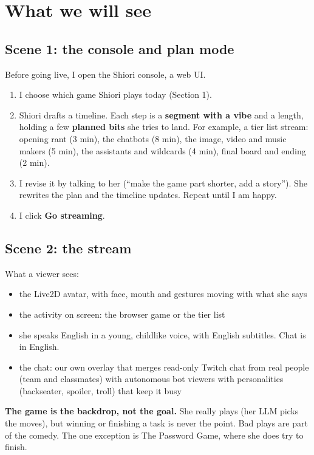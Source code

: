 \documentclass[11pt,a4paper]{article}
\begin{document}
\section{What we will see}

\subsection{Scene 1: the console and plan mode}
Before going live, I open the Shiori console, a web UI.
\begin{enumerate}
\item I choose which game Shiori plays today (Section 1).
\item Shiori drafts a timeline. Each step is a \textbf{segment with a vibe} and a length, holding a few \textbf{planned bits} she tries to land. For example, a tier list stream: opening rant (3 min), the chatbots (8 min), the image, video and music makers (5 min), the assistants and wildcards (4 min), final board and ending (2 min).
\item I revise it by talking to her (``make the game part shorter, add a story''). She rewrites the plan and the timeline updates. Repeat until I am happy.
\item I click \textbf{Go streaming}.
\end{enumerate}

\subsection{Scene 2: the stream}
What a viewer sees:
\begin{itemize}
\item the Live2D avatar, with face, mouth and gestures moving with what she says
\item the activity on screen: the browser game or the tier list
\item she speaks English in a young, childlike voice, with English subtitles. Chat is in English.
\item the chat: our own overlay that merges read-only Twitch chat from real people (team and classmates) with autonomous bot viewers with personalities (backseater, spoiler, troll) that keep it busy
\end{itemize}
\textbf{The game is the backdrop, not the goal.} She really plays (her LLM picks the moves), but winning or finishing a task is never the point. Bad plays are part of the comedy. The one exception is The Password Game, where she does try to finish.
\end{document}

